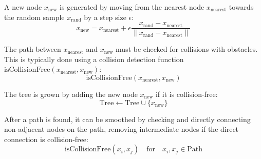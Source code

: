 \documentclass[a4paper,fleqn]{cas-dc}
\begin{document}
A new node \( x_{\text{new}} \) is generated by moving from the nearest node \( x_{\text{nearest}} \) towards the random sample \( x_{\text{rand}} \) by a step size \( \epsilon \):
\begin{equation}
x_{\text{new}} = x_{\text{nearest}} + \epsilon \frac{x_{\text{rand}} - x_{\text{nearest}}}{\| x_{\text{rand}} - x_{\text{nearest}} \|}
\end{equation}

The path between \( x_{\text{nearest}} \) and \( x_{\text{new}} \) must be checked for collisions with obstacles. This is typically done using a collision detection function \( \text{isCollisionFree}(x_{\text{nearest}}, x_{\text{new}}) \):
\begin{equation}
\text{isCollisionFree}(x_{\text{nearest}}, x_{\text{new}})
\end{equation}

The tree is grown by adding the new node \( x_{\text{new}} \) if it is collision-free:
\begin{equation}
\text{Tree} \leftarrow \text{Tree} \cup \{x_{\text{new}}\}
\end{equation}

After a path is found, it can be smoothed by checking and directly connecting non-adjacent nodes on the path, removing intermediate nodes if the direct connection is collision-free:
\begin{equation}
\text{isCollisionFree}(x_i, x_j) \quad \text{for} \quad x_i, x_j \in \text{Path}
\end{equation}
\end{document}
